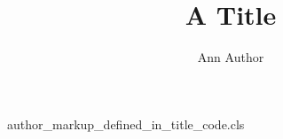\begin{filecontents*}{author_markup_defined_in_title_code.cls}
\def\maketitle{\par\begingroup\def\@makefnmark{\hbox{$^{\@thefnmark}$}}%
  \@maketitle\endgroup}
\def\@maketitle{{\Large\@title\par}%
  {\def\aff{\textsuperscript}\def\name{\bfseries}\@author\par}}
\end{filecontents*}
\documentclass{author_markup_defined_in_title_code}
\title{A Title}
\author{\name Ann Author}

\maketitle
Text.

